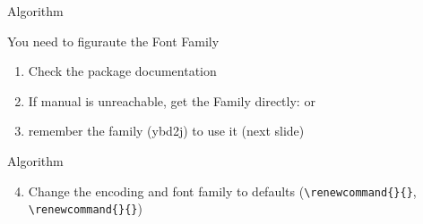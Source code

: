 \begin{frame}[fragile]{Algorithm\magicPage}\relax

You need to figuraute the {\csk Font Family}
\begin{enumerate}
     \item Check the package documentation
     \item If manual is unreachable, get the Family directly:
     \ccol{\rmdefault} or \ccol{\familydefault}
\end{enumerate}


\begin{enumerate}
    \setcounter{enumi}{2}
    \item remember the family ({\csk ybd2j}) to use it (next slide)
     
\end{enumerate}

\end{frame}

\begin{frame}[fragile]{Algorithm\magicPage}\relax


\begin{enumerate}
    \setcounter{enumi}{3}
    \item Change the encoding and font family to defaults (\verb|\renewcommand{|\ccol\encodingdefault\verb|}{|\verb|}|, \verb|\renewcommand{|\ccol\rmdefault\verb|}{|\verb|}|)
     
\end{enumerate}
\end{frame}

